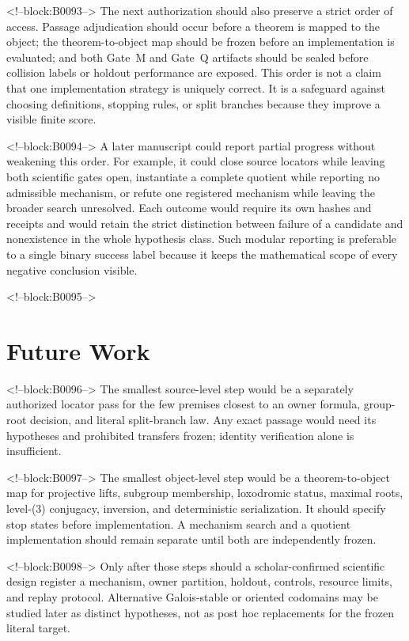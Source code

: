 \documentclass[11pt,a4paper]{article}
\begin{document}
<!--block:B0093-->
The next authorization should also preserve a strict order of access. Passage adjudication should occur before a theorem is mapped to the object; the theorem-to-object map should be frozen before an implementation is evaluated; and both Gate~M and Gate~Q artifacts should be sealed before collision labels or holdout performance are exposed. This order is not a claim that one implementation strategy is uniquely correct. It is a safeguard against choosing definitions, stopping rules, or split branches because they improve a visible finite score.

<!--block:B0094-->
A later manuscript could report partial progress without weakening this order. For example, it could close source locators while leaving both scientific gates open, instantiate a complete quotient while reporting no admissible mechanism, or refute one registered mechanism while leaving the broader search unresolved. Each outcome would require its own hashes and receipts and would retain the strict distinction between failure of a candidate and nonexistence in the whole hypothesis class. Such modular reporting is preferable to a single binary success label because it keeps the mathematical scope of every negative conclusion visible.

<!--block:B0095-->
\section{Future Work}

<!--block:B0096-->
The smallest source-level step would be a separately authorized locator pass for the few premises closest to an owner formula, group-root decision, and literal split-branch law. Any exact passage would need its hypotheses and prohibited transfers frozen; identity verification alone is insufficient.

<!--block:B0097-->
The smallest object-level step would be a theorem-to-object map for projective lifts, subgroup membership, loxodromic status, maximal roots, level-(3) conjugacy, inversion, and deterministic serialization. It should specify stop states before implementation. A mechanism search and a quotient implementation should remain separate until both are independently frozen.

<!--block:B0098-->
Only after those steps should a scholar-confirmed scientific design register a mechanism, owner partition, holdout, controls, resource limits, and replay protocol. Alternative Galois-stable or oriented codomains may be studied later as distinct hypotheses, not as post hoc replacements for the frozen literal target.
\end{document}
